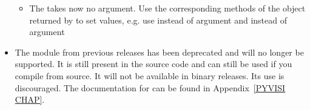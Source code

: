 \begin{itemize}
\begin{itemize}
\item The  takes now no argument. Use the corresponding
methods of the \SolverOptions object returned by  
to set values, e.g. use 
 instead of argument 
and  instead of argument 
\end{itemize}

\item
The \pyvisi module from previous releases has been deprecated and will no longer be supported.
It is still present in the source code and can still be used if you compile \escript from source.
It will not be available in binary releases.
Its use is discouraged.
The documentation for \pyvisi can be found in Appendix~\ref{PYVISI CHAP}.

\end{itemize}
